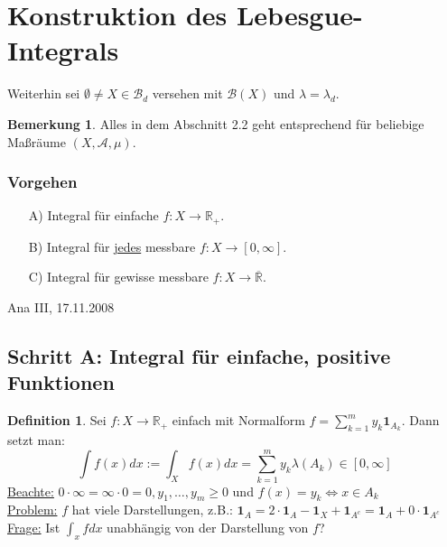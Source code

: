 \documentclass[a4paper]{report}
\newcommand{\doubleOne}{\textbf{1}}
\newcommand{\R}{\mathbb{R}}
\newcommand{\Rq}{\overline{\R}}
\newcommand{\Borel}{\mathcal{B}}
\newcommand{\Bd}{\Borel_d}
\newcommand{\jlabel}[1]{\label{j_#1}}
\newcommand{\jabb}[3]{ #1: #2 \rightarrow #3 }
\newcommand{\jspacesmall}{\vspace{4pt}}
\newcommand{\jdate}[1]{\jspacesmall\begin{center}\jlabel{#1}\tiny{Ana III, #1}\end{center}}
\theoremstyle{plain}
\theoremstyle{definition}
\newtheorem{defn}[thm]{Definition}
\newtheorem*{bem*}{Bemerkung}
\begin{document}
{{{    %
\section{Konstruktion des Lebesgue-Integrals}

Weiterhin sei $\emptyset \ne X \in \Bd$ versehen mit $\Borel(X)$ und $\lambda = \lambda_d$.
\begin{bem*}
    Alles in dem Abschnitt 2.2 geht entsprechend für beliebige Maßräume $(X,\mathcal{A}, \mu)$.
\end{bem*}

\subsubsection*{Vorgehen}
\begin{itemize}
    \item[A)] Integral für einfache $\jabb{f}{X}{\R_+}$.
    \item[B)] Integral für \uline{jedes} messbare $\jabb{f}{X}{[0,\infty]}$.
    \item[C)] Integral für gewisse messbare $\jabb{f}{X}{\Rq}$.
\end{itemize}


\jdate{17.11.2008}
 
\subsection*{Schritt A: Integral für einfache, positive Funktionen}

\begin{defn}
\jlabel{Def 2.13}
    Sei $f: X \rightarrow \R_+$ einfach mit Normalform $f = \sum_{k=1}^m y_k \doubleOne_{A_k}$. Dann setzt man:
    \begin{displaymath}
        \int f(x) dx := \int_X f(x) dx = \sum_{k=1}^m y_k \lambda(A_k) \in [0, \infty]
    \end{displaymath} 
    \uline{Beachte:} $0\cdot\infty = \infty\cdot 0 = 0, y_1, \dots, y_m \ge 0$ und $f(x) = y_k \Leftrightarrow x \in A_k$ \\
    \uline{Problem:} $f$ hat viele Darstellungen, z.B.: $\doubleOne_A = 2\cdot \doubleOne_A - \doubleOne_X + \doubleOne_{A^c} = \doubleOne_A + 0\cdot \doubleOne_{A^c}$ \\
    \uline{Frage:} Ist $\int_x f dx$ unabhängig von der Darstellung von $f$?
\end{defn}

}}}
\end{document}

